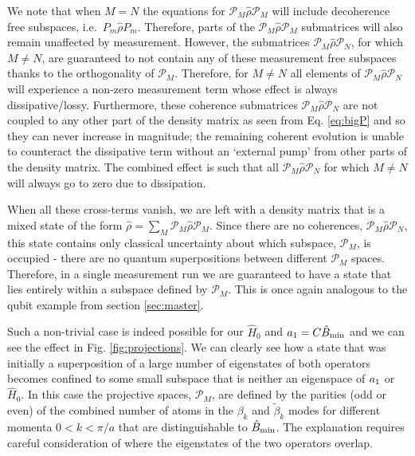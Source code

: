 We note that when $M = N$ the equations for
$\mathcal{P}_M \hat{\rho} \mathcal{P}_M$ will include decoherence free
subspaces, i.e.~$P_m \hat{\rho} P_m$. Therefore, parts of the
$\mathcal{P}_M \hat{\rho} \mathcal{P}_M$ submatrices will also remain
unaffected by measurement. However, the submatrices
$\mathcal{P}_M \hat{\rho} \mathcal{P}_N$, for which $M \ne N$, are
guaranteed to not contain any of these measurement free subspaces
thanks to the orthogonality of $\mathcal{P}_M$. Therefore, for
$M \ne N$ all elements of $\mathcal{P}_M \hat{\rho} \mathcal{P}_N$
will experience a non-zero measurement term whose effect is always
dissipative/lossy. Furthermore, these coherence submatrices
$\mathcal{P}_M \hat{\rho} \mathcal{P}_N$ are not coupled to any other
part of the density matrix as seen from Eq. \eqref{eq:bigP} and so
they can never increase in magnitude; the remaining coherent evolution
is unable to counteract the dissipative term without an `external
pump' from other parts of the density matrix. The combined effect is
such that all $\mathcal{P}_M \hat{\rho} \mathcal{P}_N$ for which
$M \ne N$ will always go to zero due to dissipation.

When all these cross-terms vanish, we are left with a density matrix
that is a mixed state of the form
$\hat{\rho} = \sum_M \mathcal{P}_M \hat{\rho} \mathcal{P}_M$. Since
there are no coherences, $\mathcal{P}_M \hat{\rho} \mathcal{P}_N$,
this state contains only classical uncertainty about which subspace,
$\mathcal{P}_M$, is occupied - there are no quantum superpositions
between different $\mathcal{P}_M$ spaces. Therefore, in a single
measurement run we are guaranteed to have a state that lies entirely
within a subspace defined by $\mathcal{P}_M$. This is once again
analogous to the qubit example from section \ref{sec:master}.

Such a non-trivial case is indeed possible for our $\hat{H}_0$ and
$a_1 = C\hat{B}_\mathrm{min}$ and we can see the effect in
Fig. \ref{fig:projections}. We can clearly see how a state that was
initially a superposition of a large number of eigenstates of both
operators becomes confined to some small subspace that is neither an
eigenspace of $a_1$ or $\hat{H}_0$. In this case the projective spaces,
$\mathcal{P}_M$, are defined by the parities (odd or even) of the
combined number of atoms in the $\beta_k$ and $\tilde{\beta}_k$ modes
for different momenta $0 < k < \pi/a$ that are distinguishable to
$\hat{B}_\mathrm{min}$. The explanation requires careful consideration of where the
eigenstates of the two operators overlap.

